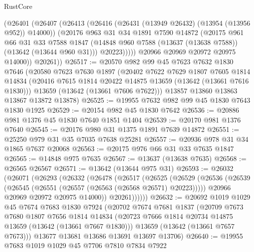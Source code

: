 \begin{lexlean}{RustCore}
\begin{coremodule}
            (@26401
              (@26407
                (@26413
                  (@26416 (@26431 (@13949 @26432) (@13954 (@13956 @952)) @14000))
                  (@20176
                    @963
                    @31
                    @34
                    @1891
                    @7590
                    @14872
                    (@20175
                      @961
                      @66
                      @31
                      @33
                      @7588
                      @1847
                      (@14848 @960 @7588 (@13637 (@13638 @7588)) (@13642 (@13644 @960 @31)))
                      @20223)))))
            @20966
            @20969
            @20972
            @20975
            @14000))
        @20261))
@26517 := @20570
    @982
    @99
    @45
    @7623
    @7632
    @1830
    @7646
    (@20580
      @7623
      @7630
      @1897
      (@20402
        @7622
        @7629
        @1807
        @7605
        @1814
        @14834
        (@20416 @7615 @1814 @20422 @14875 @13659 (@13642 (@13661 @7616 @1830)))
        @13659
        (@13642 (@13661 @7606 @7622)))
      @13857
      @13860
      @13863
      @13867
      @13872
      @13878)
@26525 := @19955 @7632 @982 @99 @45 @1830 @7643 @1830 @1925
@26529 := @20154 @982 @45 @1830 @7642
@26536 := @20886 @981 @1376 @45 @1830 @7640 @1851 @1404
@26539 := @20170 @981 @1376 @7640
@26545 := @20176 @980 @31 @1375 @1891 @7639 @14872
@26551 := @25250 @979 @31 @35 @7035 @7638 @25281
@26557 := @20936 @978 @31 @34 @1865 @7637 @20068
@26563 := @20175 @976 @66 @31 @33 @7635 @1847
@26565 := @14848 @975 @7635
@26567 := @13637 (@13638 @7635)
@26568 := @26565 @26567
@26571 := @13642 (@13644 @975 @31)
@26593 := @26032
    (@26071
      (@26293
        (@26332
          (@26478
            (@26517
              (@26525
                (@26529
                  (@26536
                    (@26539 (@26545 (@26551 (@26557 (@26563 (@26568 @26571) @20223)))))
                    @20966
                    @20969
                    @20972
                    @20975
                    @14000))
                @20261))))))
@26632 := @20692
    @1019
    @1029
    @45
    @7674
    @7683
    @1830
    @7924
    (@20702
      @7674
      @7681
      @1837
      (@20709
        @7673
        @7680
        @1807
        @7656
        @1814
        @14834
        (@20723 @7666 @1814 @20734 @14875 @13659 (@13642 (@13661 @7667 @1830)))
        @13659
        (@13642 (@13661 @7657 @7673)))
      @13677
      @13681
      @13686
      @13691
      @13697
      @13706)
@26640 := @19955 @7683 @1019 @1029 @45 @7706 @7810 @7834 @7922

\end{coremodule}
\end{lexlean}
